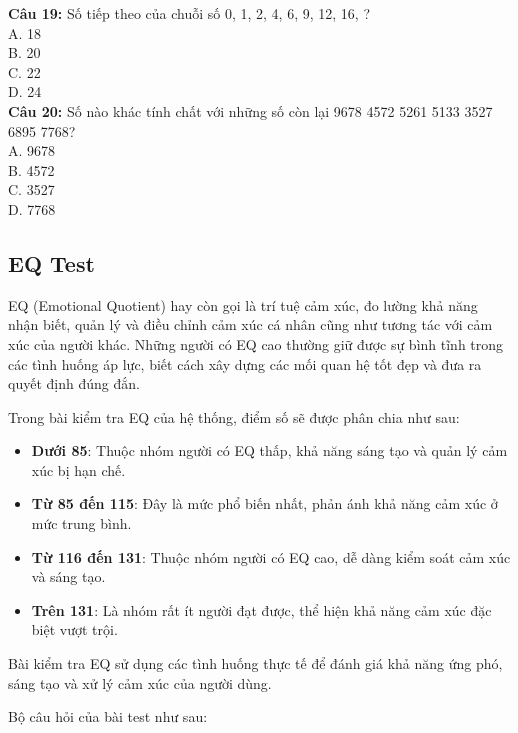 \begin{multicols}{2}
\textbf{Câu 19:} Số tiếp theo của chuỗi số 0, 1, 2, 4, 6, 9, 12, 16, ? \\
A. 18 \\
B. 20 \\
C. 22 \\
D. 24 \\

\textbf{Câu 20:} Số nào khác tính chất với những số còn lại 9678 4572 5261 5133 3527 6895 7768? \\
A. 9678 \\
B. 4572 \\
C. 3527 \\
D. 7768 \\

\end{multicols}


\subsection{EQ Test}
EQ (Emotional Quotient) hay còn gọi là trí tuệ cảm xúc, đo lường khả năng nhận biết, quản lý và điều chỉnh cảm xúc cá nhân cũng như tương tác với cảm xúc của người khác. Những người có EQ cao thường giữ được sự bình tĩnh trong các tình huống áp lực, biết cách xây dựng các mối quan hệ tốt đẹp và đưa ra quyết định đúng đắn.

Trong bài kiểm tra EQ của hệ thống, điểm số sẽ được phân chia như sau:
\begin{itemize}
    \item \textbf{Dưới 85}: Thuộc nhóm người có EQ thấp, khả năng sáng tạo và quản lý cảm xúc bị hạn chế.
    \item \textbf{Từ 85 đến 115}: Đây là mức phổ biến nhất, phản ánh khả năng cảm xúc ở mức trung bình.
    \item \textbf{Từ 116 đến 131}: Thuộc nhóm người có EQ cao, dễ dàng kiểm soát cảm xúc và sáng tạo.
    \item \textbf{Trên 131}: Là nhóm rất ít người đạt được, thể hiện khả năng cảm xúc đặc biệt vượt trội.
\end{itemize}
Bài kiểm tra EQ sử dụng các tình huống thực tế để đánh giá khả năng ứng phó, sáng tạo và xử lý cảm xúc của người dùng.


Bộ câu hỏi của bài test như sau:

